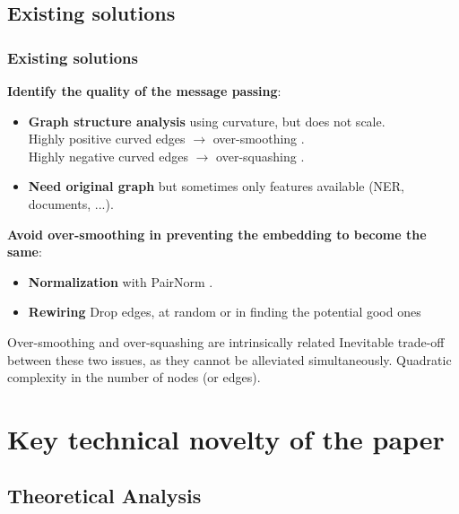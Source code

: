 \documentclass[10pt, aspectratio = 169]{beamer}
\begin{document}
\subsection{Existing solutions}
\begin{frame}
    \frametitle{Existing solutions}
    \textbf{Identify the quality of the message passing}:
    \begin{itemize}
        \item \textbf{Graph structure analysis} using curvature, but does not scale.
        \\Highly positive curved edges $\rightarrow$ over-smoothing \cite[Nguyen et al., 2023]{nguyen2023revisiting}.
        \\Highly negative curved edges $\rightarrow$ over-squashing \cite[Topping et al., 2021]{topping2022understandingoversquashingbottlenecksgraphs}.
        \item \textbf{Need original graph} but sometimes only features available (NER, documents, ...).
    \end{itemize}

    \textbf{Avoid over-smoothing in preventing the embedding to become the same}:
    \begin{itemize}
        \item \textbf{Normalization} with PairNorm \cite[Zaho, 2020]{zhao2020pairnorm}.
        \item \textbf{Rewiring} Drop edges, at random \cite[Rong, 2019]{rong2019dropedge} 
              or in finding the potential good ones \cite[Giraldo, 2023]{Giraldo_2023}
    \end{itemize}

    \begin{alertblock}{Over-smoothing and over-squashing are intrinsically related}
        Inevitable trade-off between these two issues, as they cannot be alleviated simultaneously.
        Quadratic complexity in the number of nodes (or edges).
    \end{alertblock}

\end{frame}

\section{Key technical novelty of the paper}

\subsection{Theoretical Analysis}
\end{document}
